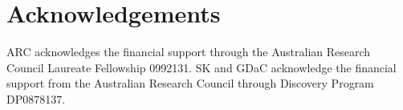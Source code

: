 \documentclass[preprint2]{aastex}
\begin{document}
	

\section{Acknowledgements}
ARC acknowledges the financial support through the Australian Research Council Laureate Fellowship 0992131. SK and GDaC acknowledge the financial support from the Australian Research Council through Discovery Program DP0878137.
\end{document}
